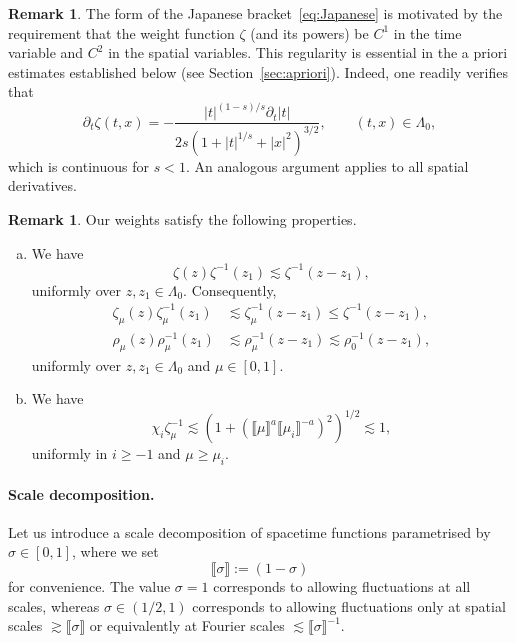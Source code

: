 \documentclass{article}
\numberwithin{equation}{section}
\newcommand{\assign}{:=}
\theoremstyle{plain}
\theoremstyle{definition}
\newtheorem{remark}[theorem]{Remark}
\begin{document}
\begin{remark}
  \label{rem:reg-weight}The form of the Japanese bracket~\eqref{eq:Japanese}
  is motivated by the requirement that the weight function $\zeta$ (and its
  powers) be $C^1$ in the time variable and $C^2$ in the spatial variables.
  This regularity is essential in the a priori estimates established below
  (see Section~\ref{sec:apriori}). Indeed, one readily verifies that
  \[ \partial_t \zeta (t, x) = - \frac{| t |^{(1 - s) / s} \partial_t | t |}{2
     s (1 + | t |^{1 / s} + | x |^2)^{3 / 2}}, \qquad (t, x) \in \Lambda_0, \]
  which is continuous for $s < 1$. An analogous argument applies to all
  spatial derivatives.
\end{remark}

\begin{remark}
  \label{rem:weight-properties}Our weights satisfy the following properties.
  \begin{enumerate}[(a)]
    \item We have
    \[ \zeta  (z) \zeta ^{- 1} (z_1) \lesssim \zeta ^{- 1} (z - z_1), \]
    uniformly over $z, z_1 \in \Lambda_0$. Consequently,
    \begin{align*}
      \zeta_{\mu} (z) \zeta_{\mu}^{- 1} (z_1) &\lesssim  \zeta_{\mu}^{- 1}
      (z - z_1) \leqslant \zeta^{- 1} (z - z_1),\\
      \rho_{\mu} (z) \rho_{\mu}^{- 1} (z_1) &\lesssim  \rho_{\mu}^{- 1} (z -
      z_1) \lesssim \rho^{- 1}_0 (z - z_1),
    \end{align*}
    uniformly over $z, z_1 \in \Lambda_0$ and $\mu \in [0, 1]$.
    
    \item We have
    \[ \chi_i \zeta_{\mu}^{- 1} \lesssim (1 + (\llbracket \mu \rrbracket^a
       \llbracket \mu_i \rrbracket^{- a})^2)^{1 / 2} \lesssim 1, \]
    uniformly in $i \geqslant - 1$ and $\mu \geqslant \mu_i$.
  \end{enumerate}
\end{remark}

\paragraph*{Scale decomposition.} Let us introduce a scale decomposition of
spacetime functions parametrised by $\sigma \in [0, 1]$, where we set
\[ \llbracket \sigma \rrbracket \assign (1 - \sigma) \]
for convenience. The value $\sigma = 1$ corresponds to allowing fluctuations
at all scales, whereas $\sigma \in (1/2,1)$ corresponds to allowing fluctuations only at spatial scales $\gtrsim \llbracket
\sigma \rrbracket$ or equivalently at Fourier scales $\lesssim \llbracket
\sigma \rrbracket^{- 1}$.
\end{document}
